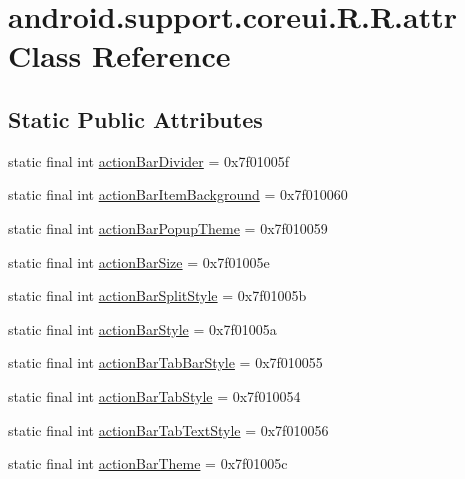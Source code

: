 \hypertarget{classandroid_1_1support_1_1coreui_1_1_r_1_1attr}{
\section{android.support.coreui.R.R.attr Class Reference}
\label{classandroid_1_1support_1_1coreui_1_1_r_1_1attr}
}
\subsection*{Static Public Attributes}
\begin{CompactItemize}
\item 
static final int \hyperlink{classandroid_1_1support_1_1coreui_1_1_r_1_1attr_7f3e9074550ebc0d03a14cb5e92c9a38}{actionBarDivider} = 0x7f01005f
\item 
static final int \hyperlink{classandroid_1_1support_1_1coreui_1_1_r_1_1attr_7f83fdf41f45b135638da4ea0512f35f}{actionBarItemBackground} = 0x7f010060
\item 
static final int \hyperlink{classandroid_1_1support_1_1coreui_1_1_r_1_1attr_408d61dbd14f27806adbefa2a151c52a}{actionBarPopupTheme} = 0x7f010059
\item 
static final int \hyperlink{classandroid_1_1support_1_1coreui_1_1_r_1_1attr_ba823cbaf68eef0ce8fc7151e3385abc}{actionBarSize} = 0x7f01005e
\item 
static final int \hyperlink{classandroid_1_1support_1_1coreui_1_1_r_1_1attr_d563a4ebe7eada2ae9350468fefaa7e7}{actionBarSplitStyle} = 0x7f01005b
\item 
static final int \hyperlink{classandroid_1_1support_1_1coreui_1_1_r_1_1attr_dbd9109618fefb13d89324f0de443b84}{actionBarStyle} = 0x7f01005a
\item 
static final int \hyperlink{classandroid_1_1support_1_1coreui_1_1_r_1_1attr_c89ed89494510d634b1ec32322684175}{actionBarTabBarStyle} = 0x7f010055
\item 
static final int \hyperlink{classandroid_1_1support_1_1coreui_1_1_r_1_1attr_76d4d6f08db415fc233d30ab903bc537}{actionBarTabStyle} = 0x7f010054
\item 
static final int \hyperlink{classandroid_1_1support_1_1coreui_1_1_r_1_1attr_039e98701473279110162371d6937ede}{actionBarTabTextStyle} = 0x7f010056
\item 
static final int \hyperlink{classandroid_1_1support_1_1coreui_1_1_r_1_1attr_01820def2a2aa3a7b3a98d5f95240b04}{actionBarTheme} = 0x7f01005c
\item 

\end{CompactItemize}
